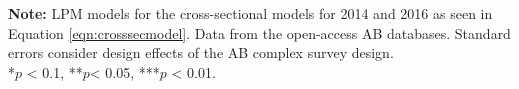 \documentclass[12pt,a4]{article}\usepackage[]{graphicx}\usepackage[]{xcolor}
\begin{document}
\begin{table}[htbp]
\begin{center}
\end{center}
\textbf{Note:} LPM models for the cross-sectional models for 2014 and 2016 as seen in Equation \ref{eqn:crosssecmodel}. Data from the open-access AB databases. Standard errors consider design effects of the AB complex survey design.\\
*$p$ < 0.1, **$p$< 0.05, ***$p$ < 0.01.
\end{table}
\end{document}
